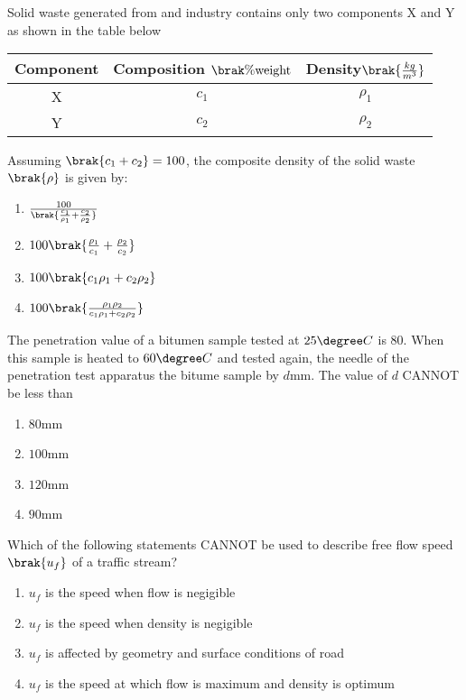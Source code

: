 \item{
Solid waste generated from and industry contains only two components X and Y as shown in the table below
\begin{table}[h!]    
  \centering
  \begin{tabular}[10pt]{|c|c|c|}
    \hline
    Component & Composition $\brak{\% \text{weight}}$ & Density$\brak{\frac{kg}{m^3}}$\\ 
    \hline
    X&$c_1$&$\rho_1$\\
    \hline 
    Y&$c_2$&$\rho_2$\\
    \hline
    \end{tabular}
\end{table}
Assuming $\brak{c_1+c_2}=100$, the composite density of the solid waste $\brak{\rho}$ is given by:
\begin{multicols}{2}
\begin{enumerate}
\item $\frac{100}{\brak{\frac{c_1}{\rho_1}+\frac{c_2}{\rho_2}}}$
\item $100\brak{\frac{\rho_1}{c_1}+\frac{\rho_2}{c_2}}$
\item $100\brak{c_1\rho_1+c_2\rho_2}$
\item $100\brak{\frac{\rho_1\rho_2}{c_1\rho_1+c_2\rho_2}}$
\end{enumerate}
\end{multicols}
}
\item{
The penetration value of a bitumen sample tested at $25\degree C$ is $80$. When this sample is heated to $60\degree C$ and tested again, the needle of the penetration test apparatus the bitume sample by $d$mm. The value of $d$ CANNOT be less than  
\begin{multicols}{4}
\begin{enumerate}
\item $80$mm
\item $100$mm
\item $120$mm
\item $90$mm
\end{enumerate}
\end{multicols}
}
\item{
Which of the following statements CANNOT be used to describe free flow speed $\brak{u_f}$ of a traffic stream? 
\begin{enumerate}
\item $u_f$ is the speed when flow is negigible
\item $u_f$ is the speed when density is negigible
\item $u_f$ is affected by geometry and surface conditions of road
\item $u_f$ is the speed at which flow is maximum and density is optimum
\end{enumerate}
}
